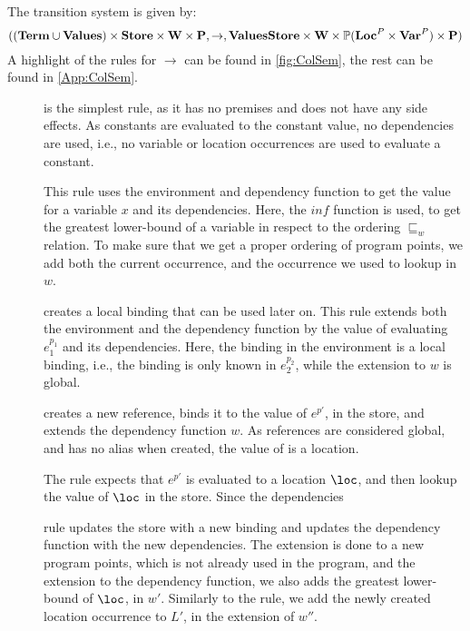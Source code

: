 \documentclass[../../master.tex]{subfiles}
\begin{document}
The transition system is given by:
$$((\textbf{Term}\cup\textbf{Values})\times\textbf{Store}\times\textbf{W}\times\textbf{P},\rightarrow,\textbf{Values}\textbf{Store}\times\textbf{W}\times\mathbb{P}(\textbf{Loc}^P\times\textbf{Var}^P)\times\textbf{P})$$
A highlight of the rules for $\rightarrow$ can be found in \cref{fig:ColSem}, the rest can be found in \cref{App:ColSem}.


\begin{description}
	\item[] is the simplest rule, as it has no premises and does not have any side effects.
		As constants are evaluated to the constant value, no dependencies are used, i.e., no variable or location occurrences are used to evaluate a constant.

	\item[] This rule uses the environment and dependency function to get the value for a variable $x$ and its dependencies.
		Here, the $inf$ function is used, to get the greatest lower-bound of a variable in respect to the ordering $\sqsubseteq_w$ relation.
		To make sure that we get a proper ordering of program points, we add both the current occurrence, and the occurrence we used to lookup in $w$.

	\item[] creates a local binding that can be used later on.
		This rule extends both the environment and the dependency function by the value of evaluating $e_1^{p_1}$ and its dependencies.
		Here, the binding in the environment is a local binding, i.e., the binding is only known in $e_2^{p_2}$, while the extension to $w$ is global.

	\item[] creates a new reference, binds it to the value of $e^{p'}$, in the store, and extends the dependency function $w$.
		As references are considered global, and has no alias when created, the value of  is a location.

	\item[] The  rule expects that $e^{p'}$ is evaluated to a location $\loc$, and then lookup the value of $\loc$ in the store.
		Since the dependencies 

	\item[] rule updates the store with a new binding and updates the dependency function with the new dependencies.
		The extension is done to a new program points, which is not already used in the program, and the extension to the dependency function, we also adds the greatest lower-bound of $\loc$, in $w'$.
		Similarly to the  rule, we add the newly created location occurrence to $L'$, in the extension of $w''$.
\end{description}
\end{document}
